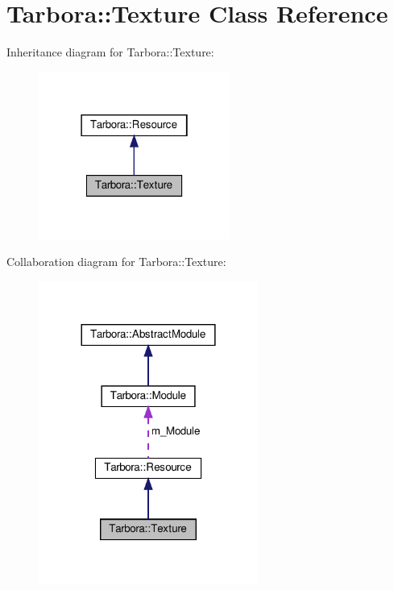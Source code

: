\hypertarget{classTarbora_1_1Texture}{}\section{Tarbora\+:\+:Texture Class Reference}
\label{classTarbora_1_1Texture}


Inheritance diagram for Tarbora\+:\+:Texture\+:\nopagebreak
\begin{figure}[H]
\begin{center}
\leavevmode
\includegraphics[width=178pt]{classTarbora_1_1Texture__inherit__graph}
\end{center}
\end{figure}


Collaboration diagram for Tarbora\+:\+:Texture\+:
\nopagebreak
\begin{figure}[H]
\begin{center}
\leavevmode
\includegraphics[width=204pt]{classTarbora_1_1Texture__coll__graph}
\end{center}
\end{figure}

